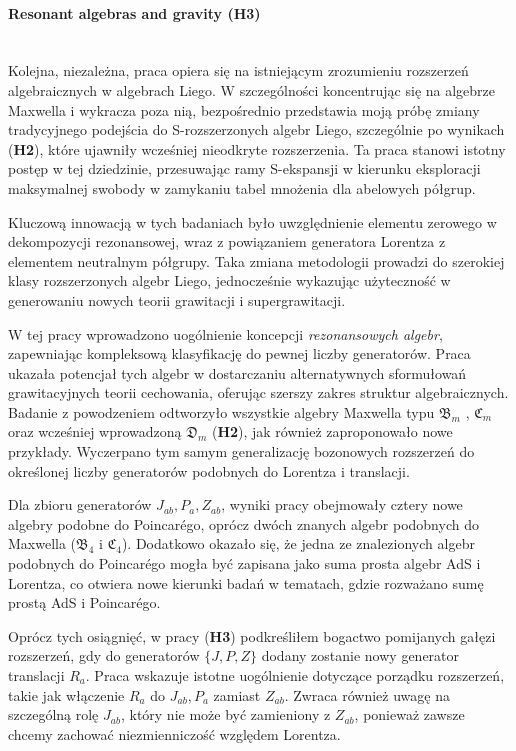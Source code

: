 \documentclass[12pt,a4paper]{article}
\newcommand{\myparagraph}[1]{\paragraph{#1}\mbox{}\\}
\begin{document}
\myparagraph{Resonant algebras and gravity (H3)} 

Kolejna, niezależna, praca opiera się na istniejącym zrozumieniu rozszerzeń algebraicznych w algebrach Liego. W szczególności koncentrując się na algebrze Maxwella i wykracza poza nią, bezpośrednio przedstawia moją próbę zmiany tradycyjnego podejścia do S-rozszerzonych algebr Liego, szczególnie po wynikach (\textbf{H2}), które ujawniły wcześniej nieodkryte rozszerzenia. Ta praca stanowi istotny postęp w tej dziedzinie, przesuwając ramy S-ekspansji w kierunku eksploracji maksymalnej swobody w zamykaniu tabel mnożenia dla abelowych półgrup.

Kluczową innowacją w tych badaniach było uwzględnienie elementu zerowego w dekompozycji rezonansowej, wraz z powiązaniem generatora Lorentza z elementem neutralnym półgrupy. Taka zmiana metodologii prowadzi do szerokiej klasy rozszerzonych algebr Liego, jednocześnie wykazując użyteczność w generowaniu nowych teorii grawitacji i supergrawitacji.

W tej pracy wprowadzono uogólnienie koncepcji \textit{rezonansowych algebr}, zapewniając kompleksową klasyfikację do pewnej liczby generatorów. Praca ukazała potencjał tych algebr w dostarczaniu alternatywnych sformułowań grawitacyjnych teorii cechowania, oferując szerszy zakres struktur algebraicznych. Badanie z powodzeniem odtworzyło wszystkie algebry Maxwella typu $\mathfrak{B}_m$ \cite{Schrader:1972zd}, $\mathfrak{C}_m$ \cite{Soroka:2006aj, Salgado:2013eut} oraz wcześniej wprowadzoną $\mathfrak{D}_m$ (\textbf{H2}), jak również zaproponowało nowe przykłady. Wyczerpano tym samym generalizację bozonowych rozszerzeń do określonej liczby generatorów podobnych do Lorentza i translacji.

Dla zbioru generatorów $J_{ab}, P_{a}, Z_{ab}$, wyniki pracy obejmowały cztery nowe algebry podobne do Poincarégo, oprócz dwóch znanych algebr podobnych do Maxwella ($\mathfrak{B}_4$ i $\mathfrak{C}_4$). Dodatkowo okazało się, że jedna ze znalezionych algebr podobnych do Poincarégo mogła być zapisana jako suma prosta algebr AdS i Lorentza, co otwiera nowe kierunki badań w tematach, gdzie rozważano sumę prostą AdS i Poincarégo.

Oprócz tych osiągnięć, w pracy (\textbf{H3}) podkreśliłem bogactwo pomijanych gałęzi rozszerzeń, gdy do generatorów $\{J, P, Z\}$ dodany zostanie nowy generator translacji $R_{a}$. Praca wskazuje istotne uogólnienie dotyczące porządku rozszerzeń, takie jak włączenie $R_a$ do $J_{ab}, P_a$ zamiast $Z_{ab}$. Zwraca również uwagę na szczególną rolę $J_{ab}$, który nie może być zamieniony z $Z_{ab}$, ponieważ zawsze chcemy zachować niezmienniczość względem Lorentza.
\end{document}
